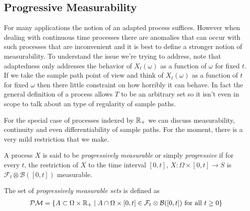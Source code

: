 \subsection{Progressive Measurability}
For many applications the notion of an adapted process
suffices.  However when dealing with continuous time processes there
are anomalies that can occur with such processes that are inconvenient
and it is best to define a stronger notion of measurability.  To
understand the issue we're trying to address, note that adaptedness only addresses the behavior of
$X_t(\omega)$ as a function of $\omega$ for fixed $t$.  If we take the
sample path point of view and think of $X_t(\omega)$ as a function of
$t$ for fixed $\omega$ then there little constraint on how horribly it
can behave.  In fact the general definition of a process allows $T$ to
be an arbitrary set so it isn't even in scope to talk about an type of
regularity of sample paths.  

For the special case of processes indexed by $\mathbb{R}_+$ we can discuss
measurability, continuity and even differentiability of sample paths.
For the moment, there is a
very mild restriction that we make.
\begin{defn}A process $X$ is said to be \emph{progressively
    measurable} or simply \emph{progressive} if for every $t$, the restriction of $X$ to the time
  interval $[0,t]$, $X : \Omega \times [0,t] \to S$ is
  $\mathcal{F}_t \otimes \mathcal{B}([0,t])$ measurable.
\end{defn}

\begin{defn}The set of \emph{progressively measurable sets} is
  defined as
\begin{align*}
\mathcal{P}\mathcal{M} = \lbrace A \subset \Omega
  \times \mathbb{R}_+ \mid A \cap \Omega \times [0,t] \in \mathcal{F}_t
  \otimes \mathcal{B}([0,t]) \text{ for all } t \geq 0\rbrace
\end{align*}
\end{defn}


